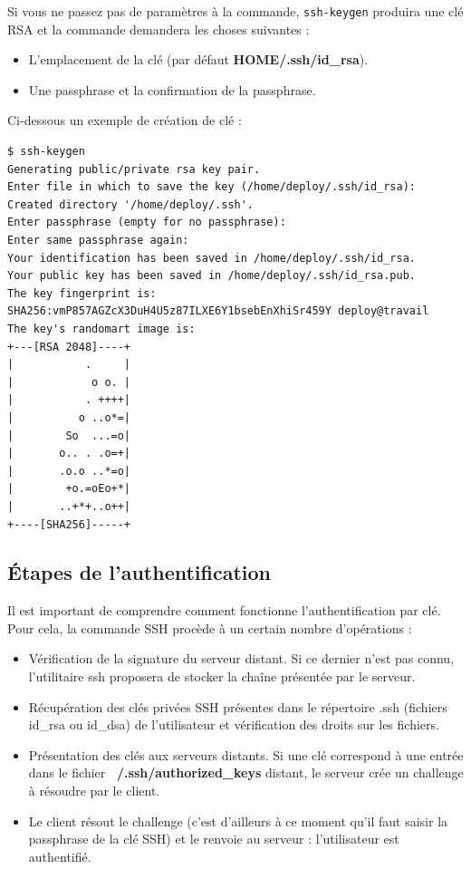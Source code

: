 \documentclass[hidelinks]{article}
\begin{document}
Si vous ne passez pas de paramètres à la commande, \texttt{ssh-keygen} produira une clé RSA et la commande demandera les choses suivantes :
\begin{itemize}
    \item L'emplacement de la clé (par défaut \textbf{HOME/.ssh/id_rsa}).
    \item Une passphrase et la confirmation de la passphrase.
\end{itemize}

Ci-dessous un exemple de création de clé :

\begin{verbatim}
$ ssh-keygen
Generating public/private rsa key pair.  
Enter file in which to save the key (/home/deploy/.ssh/id_rsa): 
Created directory '/home/deploy/.ssh'.  
Enter passphrase (empty for no passphrase):   
Enter same passphrase again:   
Your identification has been saved in /home/deploy/.ssh/id_rsa. 
Your public key has been saved in /home/deploy/.ssh/id_rsa.pub. 
The key fingerprint is:  
SHA256:vmP857AGZcX3DuH4U5z87ILXE6Y1bsebEnXhiSr459Y deploy@travail 
The key's randomart image is:  
+---[RSA 2048]----+  
|           .     |  
|            o o. |  
|           . ++++|  
|          o ..o*=|  
|        So  ...=o|  
|       o.. . .o=+|  
|       .o.o ..*=o|  
|        +o.=oEo+*|  
|       ..+*+..o++|  
+----[SHA256]-----+
\end{verbatim}

\subsection{Étapes de l'authentification}

Il est important de comprendre comment fonctionne l'authentification par clé. Pour cela, la commande SSH procède à un certain nombre d'opérations :

\begin{itemize}
    \item Vérification de la signature du serveur distant. Si ce dernier n'est pas connu, l'utilitaire ssh proposera de stocker la chaîne présentée par le serveur.
    \item Récupération des clés privées SSH présentes dans le répertoire .ssh (fichiers id_rsa ou id_dsa) de l'utilisateur et vérification des droits sur les fichiers.
    \item Présentation des clés aux serveurs distants. Si une clé correspond à une entrée dans le fichier \textbf{~/.ssh/authorized_keys} distant, le serveur crée un challenge à résoudre par le client.
    \item Le client résout le challenge (c'est d'ailleurs à ce moment qu'il faut saisir la passphrase de la clé SSH) et le renvoie au serveur : l'utilisateur est authentifié.
\end{itemize}
\end{document}

